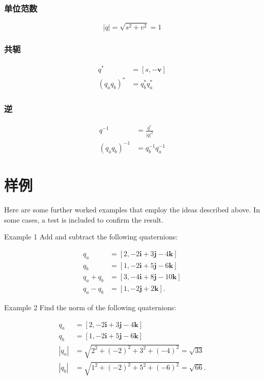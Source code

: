 \subsubsection*{单位范数}
$$
|q|=\sqrt{s^{2}+v^{2}}=1
$$

\subsubsection*{共轭}
$$
\begin{aligned}
q^{*} & =[s,-\mathbf{v}] \\
\left(q_{a} q_{b}\right)^{*} & =q_{b}^{*} q_{a}^{*}
\end{aligned}
$$

\subsubsection*{逆}
$$
\begin{aligned}
q^{-1} & =\frac{q^{*}}{|q|^{2}} \\
\left(q_{a} q_{b}\right)^{-1} & =q_{b}^{-1} q_{a}^{-1}
\end{aligned}
$$

\section{样例}
Here are some further worked examples that employ the ideas described above. In some cases, a test is included to confirm the result.

Example 1 Add and subtract the following quaternions:

$$
\begin{aligned}
q_{a} & =[2,-2 \mathbf{i}+3 \mathbf{j}-4 \mathbf{k}] \\
q_{b} & =[1,-2 \mathbf{i}+5 \mathbf{j}-6 \mathbf{k}] \\
q_{a}+q_{b} & =[3,-4 \mathbf{i}+8 \mathbf{j}-10 \mathbf{k}] \\
q_{a}-q_{b} & =[1,-2 \mathbf{j}+2 \mathbf{k}] .
\end{aligned}
$$

Example 2 Find the norm of the following quaternions:

$$
\begin{aligned}
q_{a} & =[2,-2 \mathbf{i}+3 \mathbf{j}-4 \mathbf{k}] \\
q_{b} & =[1,-2 \mathbf{i}+5 \mathbf{j}-6 \mathbf{k}] \\
\left|q_{a}\right| & =\sqrt{2^{2}+(-2)^{2}+3^{2}+(-4)^{2}}=\sqrt{33} \\
\left|q_{b}\right| & =\sqrt{1^{2}+(-2)^{2}+5^{2}+(-6)^{2}}=\sqrt{66} .
\end{aligned}
$$

